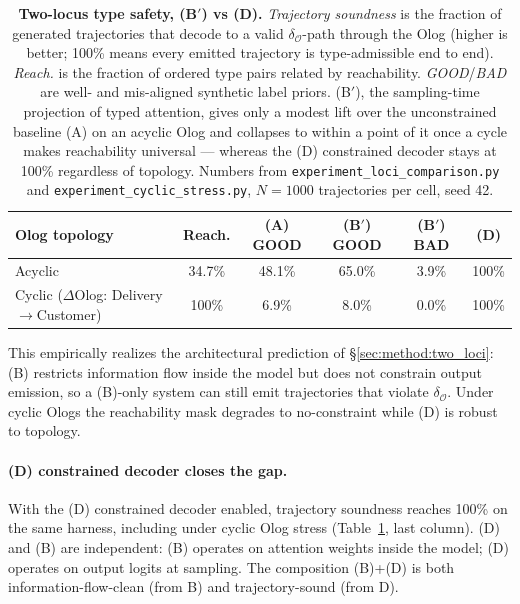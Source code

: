 \begin{table}[t]
\centering
\caption{\textbf{Two-locus type safety, (B$'$) vs (D).} \emph{Trajectory
soundness} is the fraction of generated trajectories that decode to a
valid $\delta_\mathcal{O}$-path through the Olog (higher is better; 100\%
means every emitted trajectory is type-admissible end to end).
\emph{Reach.} is the fraction of ordered type pairs related by
reachability. \emph{GOOD}/\emph{BAD} are well- and mis-aligned synthetic
label priors. (B$'$), the sampling-time projection of typed attention,
gives only a modest lift over the unconstrained baseline (A) on an
acyclic Olog and collapses to within a point of it once a cycle makes
reachability universal --- whereas the (D) constrained decoder stays at
100\% regardless of topology. Numbers from
\texttt{experiment\_loci\_comparison.py} and
\texttt{experiment\_cyclic\_stress.py}, $N{=}1000$ trajectories per cell,
seed 42.}
\label{tab:b_prime_vs_d}
\begin{tabular}{lccccc}
\toprule
Olog topology & Reach. & (A) GOOD & (B$'$) GOOD & (B$'$) BAD & (D) \\
\midrule
Acyclic & 34.7\% & 48.1\% & 65.0\% & 3.9\% & 100\% \\
Cyclic ($\Delta$Olog: Delivery$\!\to\!$Customer) & 100\% & 6.9\% & 8.0\% & 0.0\% & 100\% \\
\bottomrule
\end{tabular}
\end{table}

This empirically realizes the architectural prediction of
\S\ref{sec:method:two_loci}: (B) restricts information flow inside the
model but does not constrain output emission, so a (B)-only system can
still emit trajectories that violate $\delta_\mathcal{O}$. Under cyclic
Ologs the reachability mask degrades to no-constraint while (D) is
robust to topology.

\paragraph{(D) constrained decoder closes the gap.}
With the (D) constrained decoder enabled, trajectory soundness reaches
100\% on the same harness, including under cyclic Olog stress
(Table~\ref{tab:b_prime_vs_d}, last column). (D) and (B) are
independent: (B) operates on attention weights inside the model; (D)
operates on output logits at sampling. The composition (B)+(D) is both
information-flow-clean (from B) and trajectory-sound (from D).

